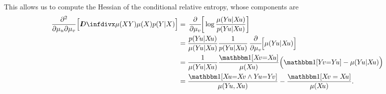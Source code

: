 \begin{lproof}
    This allows us to compute the Hessian of the conditional relative entropy, whose  components are 
    \begin{align*}
        \frac{\partial^2}{\partial \mu_u \partial \mu_v} \Big[ \kldiv{\mu(XY)}{\mu(X)p(Y|X)}\Big] 
        &= 
        \pd/d\mu_v[ \log \frac{\mu(Y\! u | X\! u)}{  p(Y\! u | X\! u)} ] \\
        &=
        \frac{ p(Y\! u | X\! u)}{\mu(Y\! u | X\! u)} \frac1{ p(Y\! u | X\! u)}
        \pd/d\mu_v[ \mu(Y\! u | X\! u) ] \\
        &= \frac{1}{\mu(Y\! u | X\! u)}
            \frac{\mathbbm1[X\!v{=}X\!u]}{\mu(X\!u)}\Big( \mathbbm1[Y\!v{=}Y\!u] - \mu(Y\!u|X\!u) \Big)\\
        &= \frac{\mathbbm1[X\!u {=} X\!v \land Y\!u {=} Y\!v]}{\mu(Y\! u, X\! u)}
            - \frac{\mathbbm1[X\!v = X\!u]}{\mu(X\!u)}
        .
    \end{align*}
    

\end{lproof}
